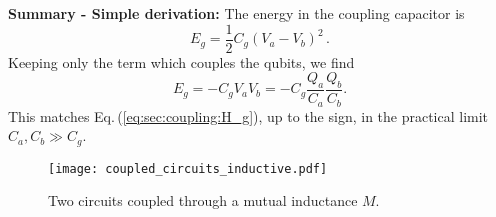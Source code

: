 \textbf{Summary - Simple derivation:} The energy in the coupling capacitor is
\begin{equation*}
  E_g = \frac{1}{2} C_g \left( V_a - V_b \right)^2 \, .
\end{equation*}
Keeping only the term which couples the qubits, we find
\begin{equation}
  E_g = -C_g V_a V_b = -C_g \frac{Q_a}{C_a} \frac{Q_b}{C_b} .
\end{equation}
This matches Eq.\,(\ref{eq:sec:coupling:H_g}), up to the sign, in the practical limit $C_a,C_b \gg C_g$.


\begin{figure}
\begin{centering}
\texttt{[image: coupled\_circuits\_inductive.pdf]}
\par\end{centering}
\caption{Two circuits coupled through a mutual inductance $M$.}
\label{Fig:coupledCircuits_inductive}
\end{figure}

